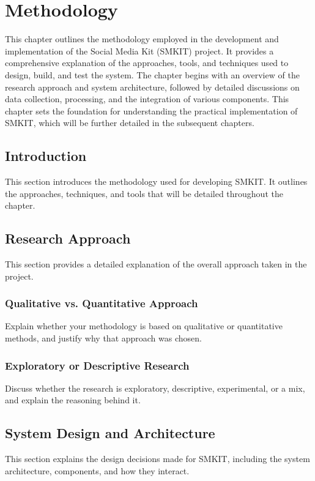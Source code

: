 
\chapter{Methodology}
\label{chp:methodology}
This chapter outlines the methodology employed in the development and implementation of the Social Media Kit (SMKIT) project. It provides a comprehensive explanation of the approaches, tools, and techniques used to design, build, and test the system. The chapter begins with an overview of the research approach and system architecture, followed by detailed discussions on data collection, processing, and the integration of various components.
This chapter sets the foundation for understanding the practical implementation of SMKIT, which will be further detailed in the subsequent chapters.

\section{Introduction}
\label{sec:introduction}
This section introduces the methodology used for developing SMKIT. It outlines the approaches, techniques, and tools that will be detailed throughout the chapter.

\section{Research Approach}
\label{sec:research_approach}
This section provides a detailed explanation of the overall approach taken in the project.

\subsection{Qualitative vs. Quantitative Approach}
\label{subsec:qualitative_vs_quantitative}
Explain whether your methodology is based on qualitative or quantitative methods, and justify why that approach was chosen.

\subsection{Exploratory or Descriptive Research}
\label{subsec:exploratory_or_descriptive}
Discuss whether the research is exploratory, descriptive, experimental, or a mix, and explain the reasoning behind it.

\section{System Design and Architecture}
\label{sec:system_design_architecture}
This section explains the design decisions made for SMKIT, including the system architecture, components, and how they interact.

